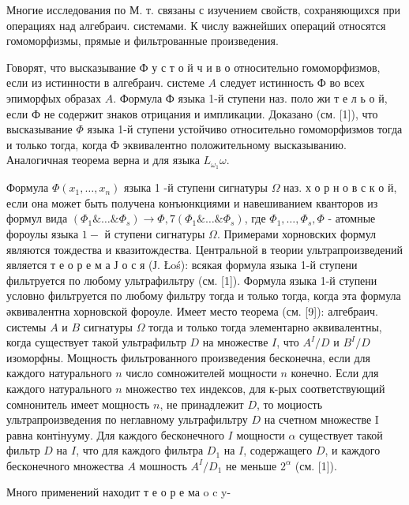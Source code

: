 \documentclass[10pt]{article}
\begin{document}
Многие исследования по М. т. связаны с изучением свойств, сохраняющихся при операциях над алгебраич. системами. К числу важнейших операций относятся гомоморфизмы, прямые и фильтрованные произведения.



Говорят, что высказывание Ф у с т о й ч и в о относительно гомоморфизмов, если из истинности в алгебраич. системе $A$ следует истинность Ф во всех эпиморфых образах $A$. Формула Ф языка 1-й ступени наз. поло жи т е л ь о й, если Ф не содержит знаков отрицания и импликации. Доказано (см. [1]), что высказывание $\Phi$ языка 1-й ступени устойчиво относительно гомоморфизмов тогда и только тогда, когда Ф эквивалентно положительному высказыванию. Аналогичная теорема верна и для языка $L_{\omega_{1}} \omega$.



Формула $\Phi\left(x_{1}, \ldots, x_{n}\right)$ языка 1 -й ступени сигнатуры $\Omega$ наз. х о р н о в с к о й, если она может быть получена конъюнкциями и навешиванием кванторов из формул вида $\left(\Phi_{1} \& \ldots \& \Phi_{s}\right) \rightarrow \Phi, 7\left(\Phi_{1} \& \ldots \& \Phi_{s}\right)$, где $\Phi_{1}, \ldots, \Phi_{s}, \Phi$ - атомные фороулы языка $1-$ й ступени сигнатуры $\Omega$. Примерами хорновских формул являются тождества и квазитождества. Центральной в теории ультрапроизведений является т е о р е м а Ј о с я (Ј. Łoś): всякая формула языка 1-й ступени фильтруется по любому ультрафильтру (см. [1]). Формула языка 1-й ступени условно фильтруется по любому фильтру тогда и только тогда, когда эта формула әквивалентна хорновской фороуле. Имеет место теорема (см. [9]): алгебраич. системы $A$ и $B$ сигнатуры $\Omega$ тогда и только тогда элементарно әквивалентны, когда существует такой ультрафильтр $D$ на множестве $I$, что $A^{I} / D$ и $B^{I} / D$ изоморфны. Мощность фильтрованного произведения бесконечна, если для каждого натурального $n$ число сомножителей мощности $n$ конечно. Если для каждого натурального $n$ множество тех индексов, для к-рых соответствующий сомнонитель имеет мощность $n$, не принадлежит $D$, то моциость ультрапроизведения по неглавному ультрафильтру $D$ на счетном множестве I равна контінууму. Для каждого бесконечного $I$ мощности $\alpha$ существует такой фильтр $D$ на $I$, что для каждого фильтра $D_{1}$ на $I$, содержащего $D$, и каждого бесконечного множества $A$ мошность $A^{I} / D_{1}$ не меньше $2^{\alpha}$ (см. [1]).



Много применений находит т е о р е ма o c y-
\end{document}
